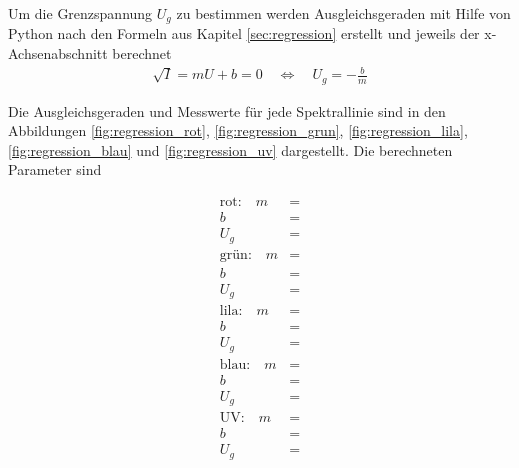 \clearpage
Um die Grenzspannung $U_g$ zu bestimmen werden Ausgleichsgeraden mit Hilfe von Python nach den Formeln aus Kapitel \ref{sec:regression} erstellt und jeweils der x-Achsenabschnitt berechnet
\begin{align}
	\sqrt{I} = mU +b = 0\quad  \Leftrightarrow 	\quad U_g = - \frac{b}{m}
\end{align}	

Die Ausgleichsgeraden und Messwerte für jede Spektrallinie sind in den Abbildungen \ref{fig:regression_rot}, \ref{fig:regression_grun}, \ref{fig:regression_lila}, \ref{fig:regression_blau} und \ref{fig:regression_uv} dargestellt. Die berechneten Parameter sind

\begin{align*}
	\text{rot:} \quad m &=  \\
	b &=  \\
	U_g &=  \\[1em]
	\text{grün:} \quad m &=  \\
	b &=  \\
	U_g &=  \\[1em]
	\text{lila:} \quad m &=  \\
	b &=  \\
	U_g &=  \\[1em]
	\text{blau:} \quad m &=  \\
	b &=  \\
	U_g &=  \\[1em]
	\text{UV:} \quad m &=  \\
	b &=  \\
	U_g &= 
\end{align*}












